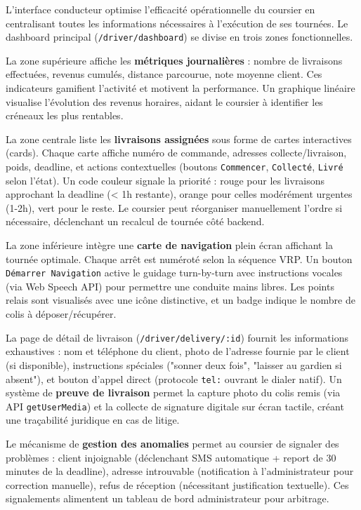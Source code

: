 L'interface conducteur optimise l'efficacité opérationnelle du coursier en centralisant toutes les informations nécessaires à l'exécution de ses tournées. Le dashboard principal (\texttt{/driver/dashboard}) se divise en trois zones fonctionnelles.

La zone supérieure affiche les \textbf{métriques journalières} : nombre de livraisons effectuées, revenus cumulés, distance parcourue, note moyenne client. Ces indicateurs gamifient l'activité et motivent la performance. Un graphique linéaire visualise l'évolution des revenus horaires, aidant le coursier à identifier les créneaux les plus rentables.

La zone centrale liste les \textbf{livraisons assignées} sous forme de cartes interactives (cards). Chaque carte affiche numéro de commande, adresses collecte/livraison, poids, deadline, et actions contextuelles (boutons \texttt{Commencer}, \texttt{Collecté}, \texttt{Livré} selon l'état). Un code couleur signale la priorité : rouge pour les livraisons approchant la deadline (< 1h restante), orange pour celles modérément urgentes (1-2h), vert pour le reste. Le coursier peut réorganiser manuellement l'ordre si nécessaire, déclenchant un recalcul de tournée côté backend.

La zone inférieure intègre une \textbf{carte de navigation} plein écran affichant la tournée optimale. Chaque arrêt est numéroté selon la séquence VRP. Un bouton \texttt{Démarrer Navigation} active le guidage turn-by-turn avec instructions vocales (via Web Speech API) pour permettre une conduite mains libres. Les points relais sont visualisés avec une icône distinctive, et un badge indique le nombre de colis à déposer/récupérer.

La page de détail de livraison (\texttt{/driver/delivery/:id}) fournit les informations exhaustives : nom et téléphone du client, photo de l'adresse fournie par le client (si disponible), instructions spéciales ("sonner deux fois", "laisser au gardien si absent"), et bouton d'appel direct (protocole \texttt{tel:} ouvrant le dialer natif). Un système de \textbf{preuve de livraison} permet la capture photo du colis remis (via API \texttt{getUserMedia}) et la collecte de signature digitale sur écran tactile, créant une traçabilité juridique en cas de litige.

Le mécanisme de \textbf{gestion des anomalies} permet au coursier de signaler des problèmes : client injoignable (déclenchant SMS automatique + report de 30 minutes de la deadline), adresse introuvable (notification à l'administrateur pour correction manuelle), refus de réception (nécessitant justification textuelle). Ces signalements alimentent un tableau de bord administrateur pour arbitrage.

